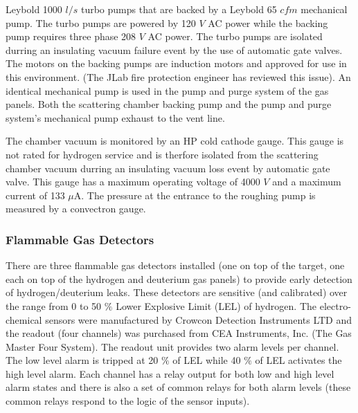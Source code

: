 \begin{safetyen}{10}{5}
{\begin{description}
Leybold 1000 $l/s$ turbo pumps that are backed by a Leybold 65 $cfm$
mechanical pump. The turbo pumps are powered by 120 $V$ AC power
while the backing pump requires three phase 208 $V$ AC power. The
turbo pumps are isolated durring an insulating vacuum failure event
by the use of automatic gate valves. The motors on the backing pumps
are induction motors and approved for use in this environment. (The
JLab fire protection engineer has reviewed this issue). An identical
mechanical pump is used in the pump and purge system of the gas panels.
Both the scattering chamber backing pump and the pump and purge system's
mechanical pump exhaust to the vent line.
\item [{\bf Vacuum Gauges}] The chamber vacuum is monitored by an HP cold
cathode gauge. This gauge is not rated for hydrogen service and is
therfore isolated from the scattering chamber vacuum durring an insulating
vacuum loss event by automatic gate valve. This gauge has a maximum
operating voltage of 4000 $V$ and a maximum current of 133 $\mu$A.
The pressure at the entrance to the roughing pump is measured by a
convectron gauge. 
\end{description}
}


\subsubsection{Flammable Gas Detectors}

There are three flammable gas detectors installed (one on top of the
target, one each on top of the hydrogen and deuterium gas panels)
to provide early detection of hydrogen/deuterium leaks. These detectors
are sensitive (and calibrated) over the range from 0 to 50 $\%$ Lower
Explosive Limit (LEL) of hydrogen. The electro-chemical sensors were
manufactured by Crowcon Detection Instruments LTD and the readout
(four channels) was purchased from CEA Instruments, Inc. (The Gas
Master Four System). The readout unit provides two alarm levels per
channel. The low level alarm is tripped at 20 $\%$ of LEL while 40
$\%$ of LEL activates the high level alarm. Each channel has a relay
output for both low and high level alarm states and there is also
a set of common relays for both alarm levels (these common relays
respond to the logic of the sensor
inputs). 
\end{safetyen}



